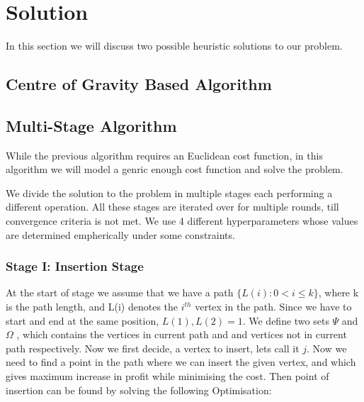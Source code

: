 \documentclass{article}
\begin{document}

 
\section{Solution}
  
In this section we will discuss two possible heuristic solutions to our problem. 

\subsection{Centre of Gravity Based Algorithm}
\cite{DEWILDE20131700} 

\subsection{Multi-Stage Algorithm}

While the previous algorithm requires an Euclidean cost function, in this algorithm we will model a genric enough cost function and solve the problem.

We divide the solution to the problem in multiple stages each performing a different operation. All these stages are iterated over for multiple rounds, till convergence criteria is not met.
We use 4 different hyperparameters whose values are determined empherically under some constraints.

\subsubsection{Stage I: Insertion Stage}

At the start of stage we assume that we have a path $\{L(i) : 0<i \leq k\}$, where k is the path length, and L(i) denotes the $i^{th}$ vertex in the path.
Since we have to start and end at the same position,
$L(1),L(2) = 1$.
We define two sets $\Psi$ and $\Omega$
, which contains the vertices in current path and and vertices not in current path respectively.
Now we first decide, a vertex to insert, lets call it $j$. Now we need to find a point in the path where we can insert the given vertex, and which gives maximum increase in profit while minimising the cost.
Then point of insertion can be found by solving the following Optimisation:
            
\end{document}
